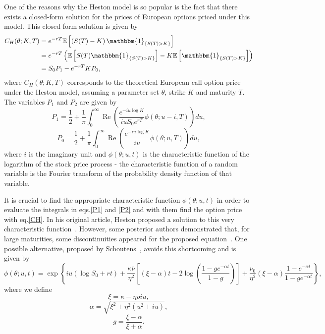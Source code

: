 One of the reasons why the Heston model is so popular is the fact that there exists a closed-form solution for the prices of European options priced under this model. This closed form solution is given by
\begin{equation}\label{CH}
\begin{split}
C_{H}(\theta;K,T)&=e^{-rT}\mathbb{E}\left[\left(S(T)-K\right)\mathbbm{1}_{\left\{S(T)>K\right\}}\right]\\
&=e^{-rT}\left(\mathbb{E}\left[S(T)\mathbbm{1}_{\left\{S(T)>K\right\}}\right]-K\mathbb{E}\left[\mathbbm{1}_{\left\{S(T)>K\right\}}\right]\right)\\
&=S_0P_1-e^{-rT}KP_0,
\end{split}
\end{equation}
\noindent where $C_{H}(\theta;K,T)$ corresponds to the theoretical European call option price under the Heston model, assuming a parameter set $\theta$, strike $K$ and maturity $T$. The variables $P_1$ and $P_2$ are given by
\begin{equation}\label{P1}
P_1=\frac{1}{2}+\frac{1}{\pi}\int_0^\infty\operatorname{Re}\left(\frac{e^{-iu\log K}}{iuS_0e^{rT}}\phi(\theta;u-i,T)\right)du,
\end{equation}
\begin{equation}\label{P2}
P_0=\frac{1}{2}+\frac{1}{\pi}\int_0^\infty\operatorname{Re}\left(\frac{e^{-iu\log K}}{iu}\phi(\theta;u,T)\right)du,
\end{equation}
\noindent where $i$ is the imaginary unit and $\phi(\theta;u,t)$ is the characteristic function of the logarithm of the stock price process - the characteristic function of a random variable is the Fourier transform of the probability density function of that variable.


It is crucial to find the appropriate characteristic function $\phi(\theta;u,t)$ in order to evaluate the integrals in eqs.\eqref{P1} and \eqref{P2} and with them find the option price with eq.\eqref{CH}. In his original article, Heston proposed a solution to this very characteristic function~\cite{Heston}. However, some posterior authors demonstrated that, for large maturities, some discontinuities appeared for the proposed equation~\cite{Kahl}. One possible alternative, proposed by Schoutens~\cite{Schoutens}, avoids this shortcoming and is given by
\begin{equation}\label{charfuncschoutens}
\phi(\theta;u,t)=\exp\left\{iu\left(\log S_0+rt\right)+\frac{\kappa\overline{\nu}}{\eta^2}\left[\left(\xi-\alpha\right)t-2\log\left(\frac{1-ge^{-\alpha t}}{1-g}\right)\right]+\frac{\nu_0}{\eta^2}\left(\xi-\alpha\right)\frac{1-e^{-\alpha t}}{1-ge^{-\alpha t}}\right\},
\end{equation}
\noindent where we define
\begin{equation}\label{xi}
\xi=\kappa-\eta\rho iu,
\end{equation}
\begin{equation}\label{alpha}
\alpha=\sqrt{\xi^2+\eta^2(u^2+iu)},
\end{equation}
\begin{equation}
g=\frac{\xi-\alpha}{\xi+\alpha}.
\end{equation}


